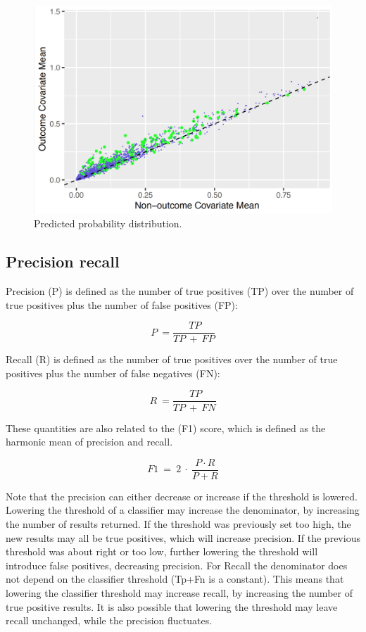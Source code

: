 \documentclass[]{book}
\begin{document}
\begin{figure}

{\centering \includegraphics[width=1\linewidth]{images/PatientLevelPrediction/variableScatterplot} 

}

\caption{Predicted probability distribution.}\label{fig:plpVarScatter}
\end{figure}

\subsection{Precision recall}\label{precision-recall}

Precision (P) is defined as the number of true positives (TP) over the
number of true positives plus the number of false positives (FP):

\[P\ =\frac{\ TP}{TP\ +\ FP}\]

Recall (R) is defined as the number of true positives over the number of
true positives plus the number of false negatives (FN):

\[R\ =\frac{\ TP}{TP\ +\ FN}\]

These quantities are also related to the (F1) score, which is defined as
the harmonic mean of precision and recall.

\[F1\ =\ 2\ \cdot\ \frac{P\cdot R}{P+R}\]

Note that the precision can either decrease or increase if the threshold
is lowered. Lowering the threshold of a classifier may increase the
denominator, by increasing the number of results returned. If the
threshold was previously set too high, the new results may all be true
positives, which will increase precision. If the previous threshold was
about right or too low, further lowering the threshold will introduce
false positives, decreasing precision. For Recall the denominator does
not depend on the classifier threshold (Tp+Fn is a constant). This means
that lowering the classifier threshold may increase recall, by
increasing the number of true positive results. It is also possible that
lowering the threshold may leave recall unchanged, while the precision
fluctuates.
\end{document}

